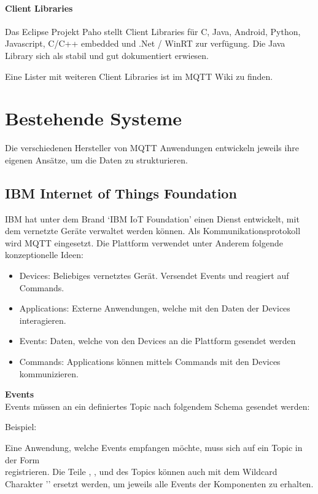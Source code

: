 \paragraph{Client Libraries}

Das Eclipse Projekt Paho \cite{paho} stellt Client Libraries für C, Java, Android, Python,
 Javascript, C/C++ embedded und .Net / WinRT zur verfügung. Die Java Library sich als stabil und gut dokumentiert erwiesen.

Eine Lister mit weiteren Client Libraries ist im MQTT Wiki \cite{clientLibs} zu finden.



\section{Bestehende Systeme}
Die verschiedenen Hersteller von MQTT Anwendungen entwickeln jeweils ihre eigenen Ansätze, um die Daten zu strukturieren. 


\subsection{IBM Internet of Things Foundation}

IBM hat unter dem Brand `IBM IoT Foundation' \cite{ibmIotF:home} einen Dienst entwickelt, mit dem vernetzte Geräte verwaltet werden können. Als Kommunikationsprotokoll wird MQTT eingesetzt. Die Plattform verwendet unter Anderem folgende konzeptionelle Ideen:
\begin{itemize}
	\item Devices: Beliebiges vernetztes Gerät. Versendet Events und reagiert auf Commands.
	\item Applications: Externe Anwendungen, welche mit den Daten der Devices interagieren.
	\item Events: Daten, welche von den Devices an die Plattform gesendet werden
	\item Commands: Applications können mittels Commands mit den Devices kommunizieren.
\end{itemize}

\textbf{Events} \\
Events müssen an ein definiertes Topic nach folgendem Schema gesendet werden: \\

Beispiel: 

Eine Anwendung, welche Events empfangen möchte, muss sich auf ein Topic in der Form \\
 registrieren.
Die Teile , ,  und  des Topics können auch mit dem Wildcard Charakter '\code{+}' ersetzt werden, um jeweils alle Events der Komponenten zu erhalten. 

